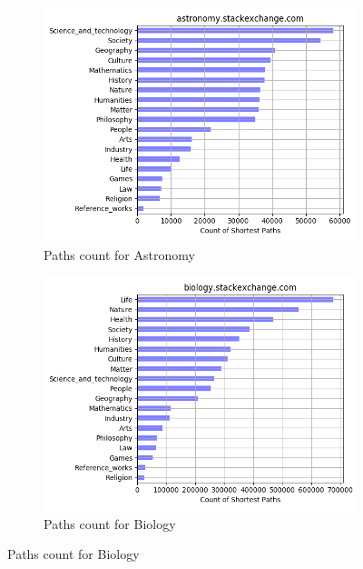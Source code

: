 

 \begin{figure}[H]
    \centering
    \begin{subfigure}{0.5\textwidth}
    \centering
        \includegraphics[width=1\linewidth]{imgs/path-counts/astronomy_stackexchange_com}
        \caption{Paths count for Astronomy}
        \label{fig:path-count-astronomy}
    \end{subfigure}%
    \begin{subfigure}{0.5\textwidth}
    \centering
        \includegraphics[width=1\linewidth]{imgs/path-counts/biology_stackexchange_com}
        \caption{Paths count for Biology}
        \label{fig:path-count-biology}
    \end{subfigure}
 

\end{figure}
